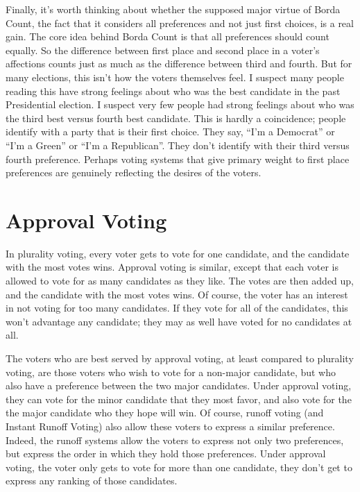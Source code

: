 \documentclass[openany]{book}
\begin{document}
Finally, it's worth thinking about whether the supposed major virtue of Borda Count, the fact that it considers all preferences and not just first choices, is a real gain. The core idea behind Borda Count is that all preferences should count equally. So the difference between first place and second place in a voter's affections counts just as much as the difference between third and fourth. But for many elections, this isn't how the voters themselves feel. I suspect many people reading this have strong feelings about who was the best candidate in the past Presidential election. I suspect very few people had strong feelings about who was the third best versus fourth best candidate. This is hardly a coincidence; people identify with a party that is their first choice. They say, ``I'm a Democrat'' or ``I'm a Green'' or ``I'm a Republican''. They don't identify with their third versus fourth preference. Perhaps voting systems that give primary weight to first place preferences are genuinely reflecting the desires of the voters. 

\section{Approval Voting}
In plurality voting, every voter gets to vote for one candidate, and the candidate with the most votes wins. Approval voting is similar, except that each voter is allowed to vote for as many candidates as they like. The votes are then added up, and the candidate with the most votes wins. Of course, the voter has an interest in not voting for too many candidates. If they vote for all of the candidates, this won't advantage any candidate; they may as well have voted for no candidates at all.

The voters who are best served by approval voting, at least compared to plurality voting, are those voters who wish to vote for a non-major candidate, but who also have a preference between the two major candidates. Under approval voting, they can vote for the minor candidate that they most favor, and also vote for the the major candidate who they hope will win. Of course, runoff voting (and Instant Runoff Voting) also allow these voters to express a similar preference. Indeed, the runoff systems allow the voters to express not only two preferences, but express the order in which they hold those preferences. Under approval voting, the voter only gets to vote for more than one candidate, they don't get to express any ranking of those candidates.
\end{document}
